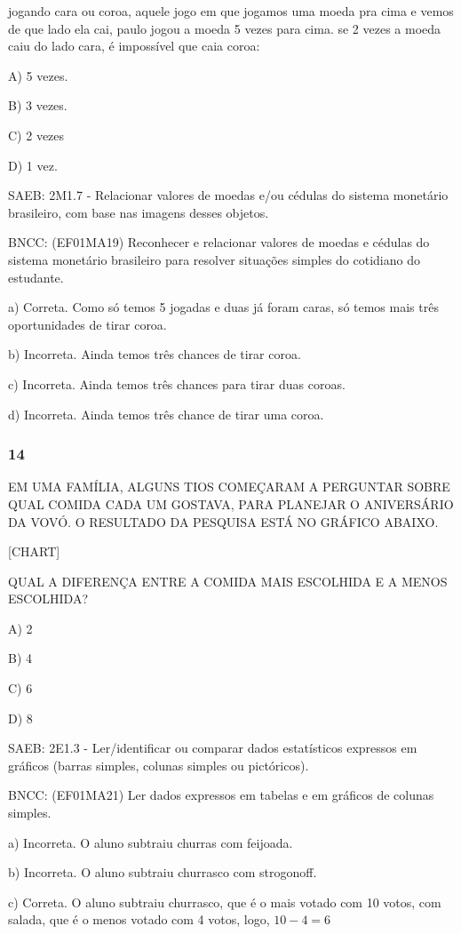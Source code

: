 \begin{itemize}
\begin{itemize}
jogando cara ou coroa, aquele jogo em que jogamos uma moeda pra cima e
vemos de que lado ela cai, paulo jogou a moeda 5 vezes para cima. se 2
vezes a moeda caiu do lado cara, é impossível que caia coroa:

A) 5 vezes.

B) 3 vezes.

C) 2 vezes

D) 1 vez.

SAEB: 2M1.7 - Relacionar valores de moedas e/ou cédulas do sistema
monetário brasileiro, com base nas imagens desses objetos.

BNCC: (EF01MA19) Reconhecer e relacionar valores de moedas e cédulas do
sistema monetário brasileiro para resolver situações simples do
cotidiano do estudante.

a) Correta. Como só temos 5 jogadas e duas já foram caras, só temos mais
três oportunidades de tirar coroa.

b) Incorreta. Ainda temos três chances de tirar coroa.

c) Incorreta. Ainda temos três chances para tirar duas coroas.

d) Incorreta. Ainda temos três chance de tirar uma coroa.

\subsubsection{14}\label{section-145}

EM UMA FAMÍLIA, ALGUNS TIOS COMEÇARAM A PERGUNTAR SOBRE QUAL COMIDA CADA
UM GOSTAVA, PARA PLANEJAR O ANIVERSÁRIO DA VOVÓ. O RESULTADO DA PESQUISA
ESTÁ NO GRÁFICO ABAIXO.

{{[}CHART{]}}

QUAL A DIFERENÇA ENTRE A COMIDA MAIS ESCOLHIDA E A MENOS ESCOLHIDA?

A) 2

B) 4

C) 6

D) 8

SAEB: 2E1.3 - Ler/identificar ou comparar dados estatísticos expressos
em gráficos (barras simples, colunas simples ou pictóricos).

BNCC: (EF01MA21) Ler dados expressos em tabelas e em gráficos de colunas
simples.

a) Incorreta. O aluno subtraiu churras com feijoada.

b) Incorreta. O aluno subtraiu churrasco com strogonoff.

c) Correta. O aluno subtraiu churrasco, que é o mais votado com 10
votos, com salada, que é o menos votado com 4 votos, logo,
\(10 - 4 = 6\)


\end{itemize}
\end{itemize}
